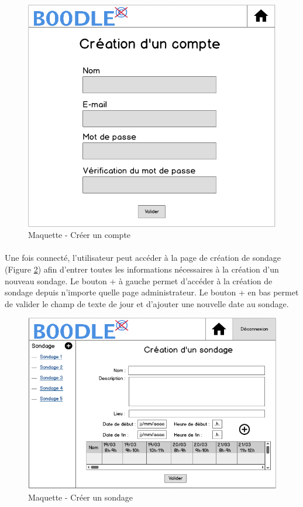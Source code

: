 \documentclass[titlepage]{report}
\begin{document}
\begin{figure}[h]
	\caption{Maquette - Créer un compte}
	\label{maquette_creationCompte}
	\centering
	\includegraphics[scale=0.7]{figures/maquettes/creationCompte.png}
\end{figure}

\paragraph{} Une fois connecté, l'utilisateur peut accéder à la page de création de sondage (Figure \ref{maquette_creationEvenement}) afin d'entrer toutes les informations nécessaires à la création d'un nouveau sondage. 
Le bouton + à gauche permet d'accéder à la création de sondage depuis n'importe quelle page administrateur. 
Le bouton + en bas permet de valider le champ de texte de jour et d'ajouter une nouvelle date au sondage.

\begin{figure}[h]
	\caption{Maquette - Créer un sondage}
	\label{maquette_creationEvenement}
	\centering
	\includegraphics[scale=0.7]{figures/maquettes/creationEvenement.png}
\end{figure}
\end{document}
